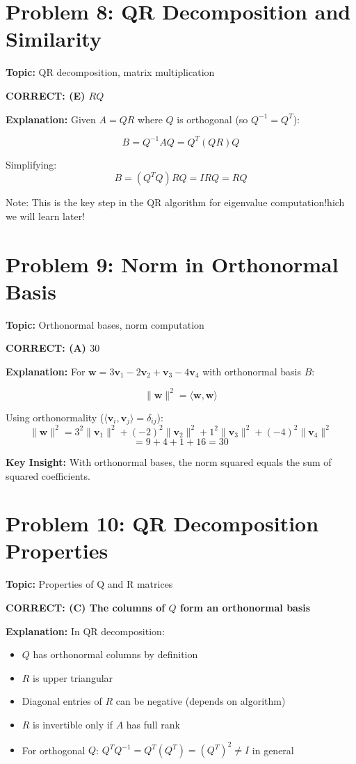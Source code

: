 \documentclass[12pt]{amsart}
\newcommand{\correct}[1]{{\color{blue}\textbf{CORRECT: #1}}}
\newcommand{\hint}{\textbf{Key Insight: }}
\begin{document}
\hrulefill

\section*{Problem 8: QR Decomposition and Similarity}
\textbf{Topic:} QR decomposition, matrix multiplication

\correct{(E) $RQ$}

\textbf{Explanation:} 
Given $A = QR$ where $Q$ is orthogonal (so $Q^{-1} = Q^T$):

$$B = Q^{-1}AQ = Q^T(QR)Q$$

Simplifying:
$$B = (Q^TQ)RQ = IRQ = RQ$$

Note: This is the key step in the QR algorithm for eigenvalue computation!hich we will learn later!

\hrulefill

\section*{Problem 9: Norm in Orthonormal Basis}
\textbf{Topic:} Orthonormal bases, norm computation

\correct{(A) $30$}

\textbf{Explanation:} 
For $\mathbf{w} = 3\mathbf{v}_1 - 2\mathbf{v}_2 + \mathbf{v}_3 - 4\mathbf{v}_4$ with orthonormal basis $B$:

$$\|\mathbf{w}\|^2 = \langle\mathbf{w}, \mathbf{w}\rangle$$

Using orthonormality ($\langle\mathbf{v}_i, \mathbf{v}_j\rangle = \delta_{ij}$):
$$\|\mathbf{w}\|^2 = 3^2\|\mathbf{v}_1\|^2 + (-2)^2\|\mathbf{v}_2\|^2 + 1^2\|\mathbf{v}_3\|^2 + (-4)^2\|\mathbf{v}_4\|^2$$
$$= 9 + 4 + 1 + 16 = 30$$

\hint With orthonormal bases, the norm squared equals the sum of squared coefficients.

\hrulefill

\section*{Problem 10: QR Decomposition Properties}
\textbf{Topic:} Properties of Q and R matrices

\correct{(C) The columns of $Q$ form an orthonormal basis}

\textbf{Explanation:} 
In QR decomposition:
\begin{itemize}
\item $Q$ has orthonormal columns by definition  
\item $R$ is upper triangular
\item Diagonal entries of $R$ can be negative (depends on algorithm)
\item $R$ is invertible only if $A$ has full rank
\item For orthogonal $Q$: $Q^TQ^{-1} = Q^T(Q^T) = (Q^T)^2 \neq I$ in general
\end{itemize}
\end{document}
